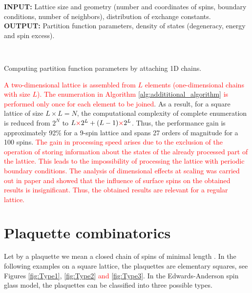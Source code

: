 \documentclass[preprint,12pt]{elsarticle}
\begin{document}
	
	\begin{algorithm}[H]
		\textbf{INPUT:} Lattice size and geometry (number and coordinates of spins, boundary conditions, number of neighbors), distribution of exchange constants.\\
		\textbf{OUTPUT:} Partition function parameters, density of states (degeneracy, energy and spin excess).
		\begin{algorithmic}
			{
				{
				}
				\ENDFOR \\
			}
			\ENDFOR
		\end{algorithmic}
		\caption{Computing partition function parameters by attaching 1D chains.}
		\label{alg:addititional_algorithm}
	\end{algorithm}
	
	\textcolor{red}{A two-dimensional lattice is assembled from $L$ elements (one-dimensional chains with size $L$). The enumeration in Algorithm \ref{alg:addititional_algorithm} is performed only once for each element to be joined}. As a result, for a square lattice of size $L \times L = N$, the computational complexity of complete enumeration is reduced from $2^{N}$ to $L \textcolor{red}{\times} 2^L + (L - 1) \textcolor{red}{\times} 2^L$. Thus, the performance gain is approximately 92\% for a 9-spin lattice and spans 27 orders of magnitude for a 100 spins. \textcolor{red}{The gain in processing speed arises due to the exclusion of the operation of storing information about the states of the already processed part of the lattice. This leads to the impossibility of processing the lattice with periodic boundary conditions. The analysis of dimensional effects at scaling was carried out in paper \cite{trukhin2024thermodynamic} and showed that the influence of surface spins on the obtained results is insignificant. Thus, the obtained results are relevant for a regular lattice.}
	
	\section{Plaquette combinatorics}
	
	Let by a plaquette we mean a closed chain of spins of minimal length \cite{lebrecht2015j}. In the following examples on a square lattice, the plaquettes are elementary squares, see Figures \ref{fig:Type1}, \ref{fig:Type2} \textcolor{red}{and} \ref{fig:Type3}. In the Edwards-Anderson spin glass model, the plaquettes can be classified into three possible types. 
	
\end{document}
